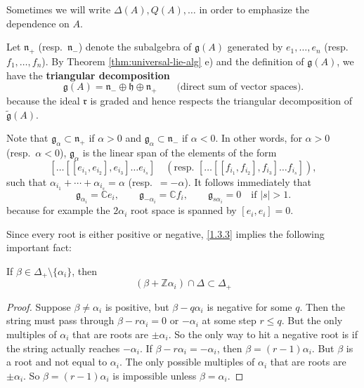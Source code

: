 \documentclass[12pt]{article}
\begin{document}
Sometimes we will write $\Delta(A), Q(A), \dots$ in order to emphasize the
dependence on $A$.

Let $\mathfrak{n}_+$ (resp.\ $\mathfrak{n}_-$) denote the subalgebra of
$\mathfrak{g}(A)$ generated by $e_1,\dots,e_n$ (resp.\ $f_1,\dots,f_n$).
By Theorem \ref{thm:universal-lie-alg} e) and the definition of $\mathfrak{g}(A)$, we have the \textbf{triangular decomposition}
\[
    \mathfrak{g}(A) = \mathfrak{n}_- \oplus \mathfrak{h} \oplus \mathfrak{n}_+
    \qquad \text{(direct sum of vector spaces).}
\] because the ideal $\mathfrak{r}$ is graded and hence respects the triangular decomposition of $\tilde{\mathfrak{g}}(A)$.

Note that $\mathfrak{g}_\alpha \subset \mathfrak{n}_+$ if $\alpha>0$ and
$\mathfrak{g}_\alpha \subset \mathfrak{n}_-$ if $\alpha<0$. In other words,
for $\alpha>0$ (resp.\ $\alpha<0$), $\mathfrak{g}_\alpha$ is the linear span
of the elements of the form
\[
    [\dots [[e_{i_1},e_{i_2}],e_{i_3}] \dots e_{i_s}]
    \quad (\text{resp.\ } [\dots [[f_{i_1},f_{i_2}],f_{i_3}] \dots f_{i_s}]),
\]
such that $\alpha_{i_1}+\cdots+\alpha_{i_s} = \alpha$
(resp.\ $= -\alpha$). It follows immediately that
\begin{equation}\label{1.3.3}
    \mathfrak{g}_{\alpha_i} = \mathbb{C}e_i, \qquad
    \mathfrak{g}_{-\alpha_i} = \mathbb{C}f_i, \qquad
    \mathfrak{g}_{s\alpha_i} = 0 \quad \text{if } |s|>1.
\end{equation}
because for example the $2\alpha_i$ root space is spanned by $[e_i,e_i] = 0$.

Since every root is either positive or negative, \eqref{1.3.3} implies the
following important fact:

\begin{lemma}{\label{lem:rt-string}}
    If $\beta \in \Delta_+ \setminus \{\alpha_i\}$, then
    $$(\beta + \mathbb{Z}\alpha_i)\cap \Delta \subset \Delta_+$$
\end{lemma}
\begin{proof}
    Suppose $\beta\neq \alpha_i$ is positive, but $\beta - q\alpha_i$ is negative for some $q$. Then the string must pass through $\beta - r\alpha_i = 0$ or $-\alpha_i$ at some step $r \leq q$. But the only multiples of $\alpha_i$ that are roots are $\pm \alpha_i$. So the only way to hit a negative root is if the string actually reaches $-\alpha_i$. If $\beta - r\alpha_i = -\alpha_i$, then $\beta = (r-1)\alpha_i$. But $\beta$ is a root and not equal to $\alpha_i$. The only possible multiples of $\alpha_i$ that are roots are $\pm\alpha_i$. So $\beta = (r-1)\alpha_i$ is impossible unless $\beta=\alpha_i$.
\end{proof}
\end{document}
